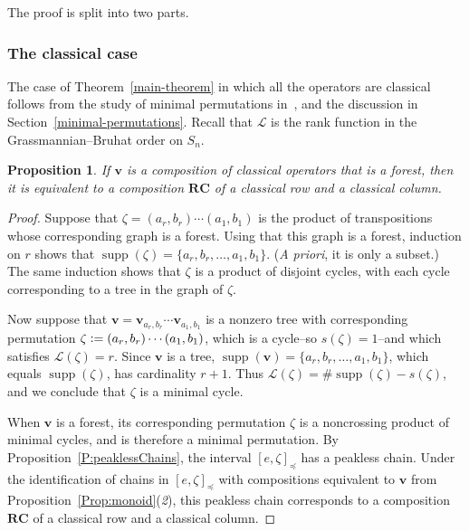 \documentclass[12pt,oneside,reqno]{amsart}
\newtheorem{proposition}[theorem]{Proposition}
\theoremstyle{definition}
\numberwithin{equation}{section}
\newcommand{\calL}{{\mathcal L}}
\newcommand{\qv}{{\mathbf v}}
\DeclareMathOperator{\supp}{supp}
\def\R{\mathbf{R}}
\def\C{\mathbf{C}}
\begin{document}
The proof is split into two parts.

\subsubsection{The classical case}

The case of Theorem~\ref{main-theorem} in which all the operators are
classical follows from the study of minimal permutations in~\cite[Sect.~6.2]{BS-iso}, and the discussion in
Section~\ref{minimal-permutations}.
Recall that $\calL$ is the rank function in the Grassmannian--Bruhat order on $S_n$.

\begin{proposition}
    \label{BS2002}
    If $\qv$ is a composition of classical operators that is a forest, then it is equivalent to a composition $\R\C$ of a 
    classical row and a classical column. 
\end{proposition}
\begin{proof}
  Suppose that $\zeta=(a_r,b_r)\dotsb(a_1,b_1)$ is the product of transpositions whose corresponding graph is a forest.
  Using that this graph is a forest, induction on $r$ shows that $\supp(\zeta)=\{a_r,b_r,\dotsc,a_1,b_1\}$.
  ({\it A priori}, it is only a subset.)
  The same induction shows that $\zeta$ is a product of disjoint cycles, with each cycle corresponding to a tree in the graph of
  $\zeta$. 

  Now suppose that $\qv=\qv_{a_r,b_r}\dotsb\qv_{a_1,b_1}$ is a nonzero tree with corresponding permutation
  $\zeta\vcentcolon=(a_r,b_r)\dotsb(a_1,b_1)$, which is a cycle--so $s(\zeta)=1$--and which satisfies $\calL(\zeta)=r$.
  Since $\qv$ is a tree, $\supp(\qv)=\{a_r,b_r,\dotsc,a_1,b_1\}$, which equals $\supp(\zeta)$,  has cardinality $r{+}1$.
  Thus $\calL(\zeta)=\#\supp(\zeta)-s(\zeta)$, and we conclude that  $\zeta$ is a minimal cycle.

  When $\qv$ is a forest, its corresponding permutation $\zeta$ is a noncrossing product of minimal cycles, and is therefore a
  minimal permutation.
  By Proposition~\ref{P:peaklessChains}, the interval $[e,\zeta]_\preceq$ has a peakless chain.
  Under the identification of chains in  $[e,\zeta]_\preceq$ with compositions equivalent to $\qv$ from
  Proposition~\ref{Prop:monoid}({\it 2}), this peakless chain corresponds to a composition $\R\C$ of a classical row and a
  classical column.
\end{proof}
\end{document}
